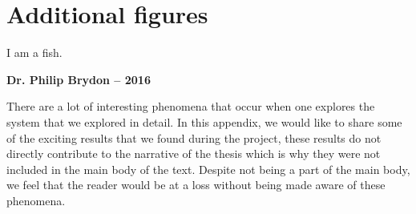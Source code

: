 \chapter{Additional figures}
\setlength{}
\epigraph{I am a fish.}{\textbf{Dr. Philip Brydon -- 2016}}

There are a lot of interesting phenomena that occur when one explores the system that we explored in detail. In this appendix, we would like to share some of the exciting results that we found during the project, these results do not directly contribute to the narrative of the thesis which is why they were not included in the main body of the text. Despite not being a part of the main body, we feel that the reader would be at a loss without being made aware of these phenomena.
